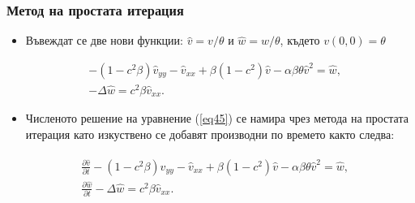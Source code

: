 \documentclass{beamer}
\newcommand{\rf}[1]{(\ref{#1})}
\begin{document}
\begin{frame}
\frametitle{Метод на простата итерация} 
\begin{itemize}
  \item Въвеждат се две нови функции: $\widehat{v}=v/{\theta} $ и $\widehat{w}=w/{\theta} $, където $v(0,0)=\theta$
\end{itemize}
\begin{equation}\label{eq45}
\begin{split}
 &- (1 - c^2 \beta) \widehat{v}_{yy} -\widehat{v}_{xx} + \beta (1-c^2) \widehat{v} - \alpha \beta \theta \widehat{v}^2 = \widehat{w}, \\
 &- \Delta \widehat{w} =  c^2 \beta \widehat{v}_{xx}.
\end{split}
\end{equation}

\begin{itemize}
  \item Численото решение на уравнение \rf{eq45} се намира чрез метода на простата итерация като изкуствено се добавят производни по времето както следва:
\end{itemize}
\begin{align}\label{eq5}
\begin{split}
 &\frac {\partial \widehat{v}}{\partial t} - (1 - c^2 \beta) \widehat{v}_{yy} -\widehat{v}_{xx} + \beta (1-c^2) \widehat{v} - \alpha \beta \theta \widehat{v}^2 = \widehat{w}, \\
 &\frac {\partial \widehat{w}}{\partial t} - \Delta \widehat{w} =  c^2 \beta \widehat{v}_{xx}. 
\end{split}
\end{align}

\end{frame}
\end{document}

